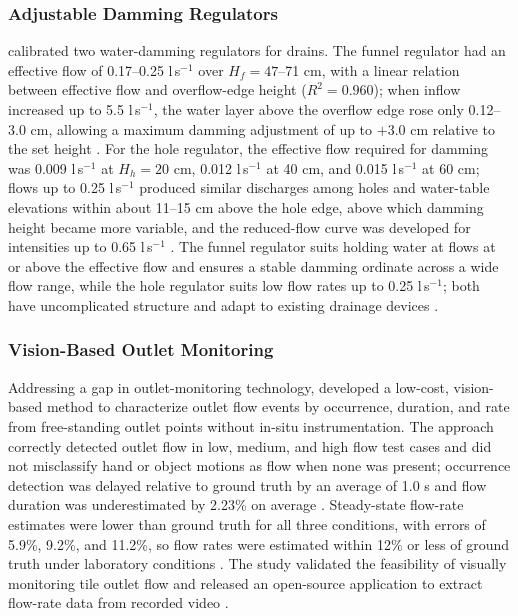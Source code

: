 \documentclass[11pt]{article}
\begin{document}
\subsubsection{Adjustable Damming Regulators}

\textcite{Popek2021} calibrated two water-damming regulators for drains. The funnel
regulator had an effective flow of 0.17--0.25 l\,s$^{-1}$ over $H_f = 47$--71 cm, with a
linear relation between effective flow and overflow-edge height ($R^2 = 0.960$); when inflow
increased up to 5.5 l\,s$^{-1}$, the water layer above the overflow edge rose only
0.12--3.0 cm, allowing a maximum damming adjustment of up to $+3.0$ cm relative to the set
height \parencite{Popek2021}. For the hole regulator, the effective flow required for
damming was 0.009 l\,s$^{-1}$ at $H_h = 20$ cm, 0.012 l\,s$^{-1}$ at 40 cm, and
0.015 l\,s$^{-1}$ at 60 cm; flows up to 0.25 l\,s$^{-1}$ produced similar discharges among
holes and water-table elevations within about 11--15 cm above the hole edge, above which
damming height became more variable, and the reduced-flow curve was developed for
intensities up to 0.65 l\,s$^{-1}$ \parencite{Popek2021}. The funnel regulator suits
holding water at flows at or above the effective flow and ensures a stable damming ordinate
across a wide flow range, while the hole regulator suits low flow rates up to
0.25 l\,s$^{-1}$; both have uncomplicated structure and adapt to existing drainage devices
\parencite{Popek2021}.

\subsubsection{Vision-Based Outlet Monitoring}

Addressing a gap in outlet-monitoring technology, \textcite{Young2023} developed a
low-cost, vision-based method to characterize outlet flow events by occurrence, duration,
and rate from free-standing outlet points without in-situ instrumentation. The approach
correctly detected outlet flow in low, medium, and high flow test cases and did not
misclassify hand or object motions as flow when none was present; occurrence detection was
delayed relative to ground truth by an average of 1.0 s and flow duration was underestimated
by 2.23\% on average \parencite{Young2023}. Steady-state flow-rate estimates were lower than
ground truth for all three conditions, with errors of 5.9\%, 9.2\%, and 11.2\%, so flow
rates were estimated within 12\% or less of ground truth under laboratory conditions
\parencite{Young2023}. The study validated the feasibility of visually monitoring tile
outlet flow and released an open-source application to extract flow-rate data from recorded
video \parencite{Young2023}.
\end{document}

